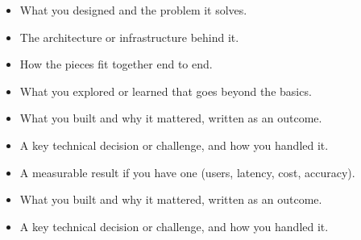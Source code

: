 
\begin{itemize}
  \item What you designed and the problem it solves.
  \item The architecture or infrastructure behind it.
  \item How the pieces fit together end to end.
  \item What you explored or learned that goes beyond the basics.
\end{itemize}

\begin{itemize}
  \item What you built and why it mattered, written as an outcome.
  \item A key technical decision or challenge, and how you handled it.
  \item A measurable result if you have one (users, latency, cost, accuracy).
\end{itemize}

\begin{itemize}
  \item What you built and why it mattered, written as an outcome.
  \item A key technical decision or challenge, and how you handled it.
\end{itemize}
